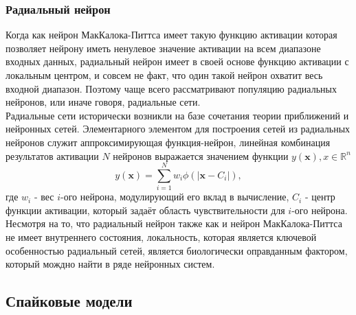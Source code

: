 \documentclass[a4paper,10pt]{article}
\begin{document}
\subsubsection{Радиальный нейрон}
\indent Когда как нейрон МакКалока-Питтса имеет такую функцию активации которая позволяет нейрону иметь ненулевое значение активации на всем  диапазоне входных данных, радиальный нейрон имеет в своей основе функцию активации с локальным центром, и совсем не факт, что один такой нейрон охватит весь входной диапазон. Поэтому чаще всего рассматривают популяцию радиальных нейронов, или иначе говоря, радиальные сети.\\ 
\indent Радиальные сети исторически возникли на базе сочетания теории приближений и нейронных сетей. Элементарного элементом для построения сетей из радиальных нейронов служит аппроксимирующая функция-нейрон, линейная комбинация результатов активации $N$ нейронов выражается значением функции $y(\boldsymbol{x}), x\in \mathbb{R}^n$
   \begin{equation*}\label{eq:rbf}
   y(\boldsymbol{x}) = \sum_{i=1}^{N}w_{i}\phi(|\boldsymbol{x}-C_{i}|),
   \end{equation*}
где $w_{i}$ - вес $i$-ого нейрона, модулирующий его вклад в вычисление, $C_{i}$ - центр функции активации, который задаёт область чувствительности для $i$-ого нейрона.\\
\indent Несмотря на то, что радиальный нейрон также как и нейрон МакКалока-Питтса не имеет внутреннего состояния, локальность, которая является ключевой особенностью радиальный сетей, является биологически оправданным фактором, который мождно найти в ряде нейронных систем.\\

\subsection{Спайковые модели}   
\end{document}

